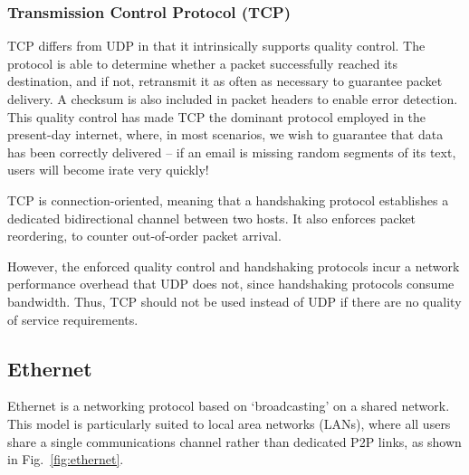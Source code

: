 \documentclass[aps, rmp, twocolumn, amsmath, amssymb, nofootinbib, superscriptaddress, longbibliography, floatfix, table-of-contents, eqsecnum]{revtex4-1}
\begin{document}
\subsubsection{Transmission Control Protocol (TCP)} \label{sec:TCP} 

TCP differs from UDP in that it intrinsically supports quality control. The protocol is able to determine whether a packet successfully reached its destination, and if not, retransmit it as often as necessary to guarantee packet delivery. A checksum is also included in packet headers to enable error detection. This quality control has made TCP the dominant protocol employed in the present-day internet, where, in most scenarios, we wish to guarantee that data has been correctly delivered -- if an email is missing random segments of its text, users will become irate very quickly!

TCP is connection-oriented, meaning that a handshaking protocol establishes a dedicated bidirectional channel between two hosts. It also enforces packet reordering, to counter out-of-order packet arrival.

However, the enforced quality control and handshaking protocols incur a network performance overhead that UDP does not, since handshaking protocols consume bandwidth. Thus, TCP should not be used instead of UDP if there are no quality of service requirements.

%
%

\subsection{Ethernet} 

Ethernet is a networking protocol based on `broadcasting' on a shared network. This model is particularly suited to local area networks (LANs), where all users share a single communications channel rather than dedicated P2P links, as shown in Fig.~\ref{fig:ethernet}.
\end{document}
